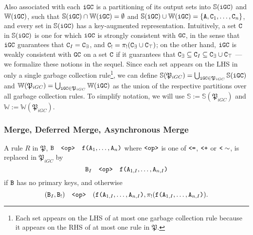 Also associated with each $\tt{iGC}$ is a partitioning of its output sets into $\mathbb{S}(\tt{iGC})$ and $\mathbb{W}(\tt{iGC})$, such that $\mathbb{S}(\tt{iGC}) \cap \mathbb{W}(\tt{iGC}) = \emptyset$ and $\mathbb{S}(\tt{iGC}) \cup \mathbb{W}(\tt{iGC}) = \{\tt{A}, \tt{C}_1, \dots, \tt{C}_n\}$,
and every set in $\mathbb{S}(\tt{iGC})$ has a key-augmented representation.
Intuitively, a set $\tt{C}$ in $\mathbb{S}(\tt{iGC})$ is one for which $\tt{iGC}$ is strongly consistent with $\tt{GC}$, in the sense that $\tt{iGC}$ guarantees that $\tt{C}_I = \tt{C}_\exists$, and $\tt{C}_! = \pi_!(\tt{C}_\exists \cup \tt{C}_\top)$;
on the other hand, $\tt{iGC}$ is weakly consistent with $\tt{GC}$ on a set $\tt{C}$ if it guarantees that $\tt{C}_\exists \subseteq \tt{C}_I \subseteq \tt{C}_\exists \cup \tt{C}_\top$
--- we formalize these notions in the sequel.
Since each set appears on the LHS in only a single garbage collection rule\footnote{
	Each set appears on the LHS of at most one garbage collection rule because it appears on the RHS of at most one rule in $\mathfrak{P}$.
}, we can define
$\mathbb{S}(\mathfrak{P}_{iGC}) = \bigcup_{\tt{iGC} \in \mathfrak{P}_{iGC}} \mathbb{S}(\tt{iGC})$
and
$\mathbb{W}(\mathfrak{P}_{iGC}) = \bigcup_{\tt{iGC} \in \mathfrak{P}_{iGC}} \mathbb{W}(\tt{iGC})$
as the union of the respective partitions over all garbage collection rules.
To simplify notation, we will use $\mathbb{S} := \mathbb{S}(\mathfrak{P}_{iGC})$ and $\mathbb{W} := \mathbb{W}(\mathfrak{P}_{iGC})$.


\subsubsection{Merge, Deferred Merge, Asynchronous Merge}
A rule $R$ in $\mathfrak{P}$,
$\tt{B} \quad\tt{<op>}\quad \tt{f}\tt{(}\tt{A}_1,\dots,\tt{A}_n\tt{)}$
where $\tt{<op>}$ is one of $\tt{<=}$, $\tt{<+}$ or $\tt{<}\sim$, is replaced in $\mathfrak{P}_{iGC}$ by
\[\tt{B}_I \quad\tt{<op>}\quad \tt{f}\tt{(}\tt{A}_{1,I},\dots,\tt{A}_{n,I}\tt{)}\]
if $\tt{B}$ has no primary keys, and otherwise
\[(\tt{B}_I, \tt{B}_!) \quad\tt{<op>}\quad (\tt{f}\tt{(}\tt{A}_{1,I},\dots,\tt{A}_{n,I}\tt{)}, \pi_!(\tt{f}\tt{(}\tt{A}_{1,I},\dots,\tt{A}_{n,I}\tt{)}).\]




